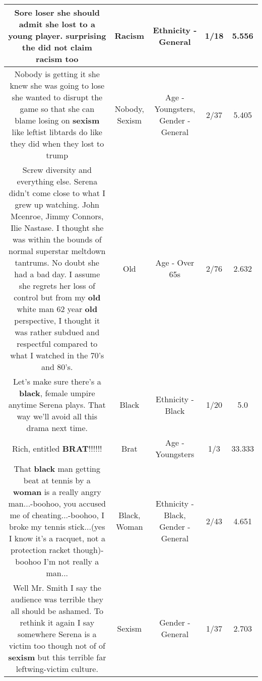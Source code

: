 \documentclass[11pt]{article}
\newlength\mylength
\begin{document}
\begin{center}
\begin{longtable}{|C{.65\mylength}|C{.30\mylength}|C{.12\mylength}|C{.12\mylength}|C{.12\mylength}|}
  \small Sore loser she should admit she lost to a young player. surprising the did not claim \textbf{racism} too\normalsize   & Racism & Ethnicity - General & 1/18 & 5.556 \\  \hline
  \small Nobody is getting it she knew she was going to lose she wanted to disrupt the game so that she can blame losing on \textbf{sexism} like leftist libtards do like they did when they lost to trump\normalsize   & Nobody, Sexism & Age - Youngsters, Gender - General & 2/37 & 5.405 \\  \hline
  \small Screw diversity and everything else.  Serena didn't come close to what I grew up watching.  John Mcenroe, Jimmy Connors, Ilie Nastase.  I thought she was within the bounds of normal  superstar meltdown tantrums.  No doubt she had a bad day.  I assume she regrets her loss of control but from my \textbf{old} white man 62 year \textbf{old} perspective, I thought it was rather subdued and respectful compared to what I watched in the 70's and 80's.\normalsize   & Old & Age - Over 65s & 2/76 & 2.632 \\  \hline
  \small Let's make sure there's a \textbf{black}, female umpire anytime Serena plays. That way we'll avoid all this drama next time.\normalsize   & Black & Ethnicity - Black & 1/20 & 5.0 \\  \hline
  \small Rich, entitled \textbf{BRAT}!!!!!!\normalsize   & Brat & Age - Youngsters & 1/3 & 33.333 \\  \hline
  \small That \textbf{black} man getting beat at tennis by a \textbf{woman} is a really angry man...-boohoo, you accused me of cheating...-boohoo, I broke my tennis stick...(yes I know it's a racquet, not a protection racket though)-boohoo I'm not really a man...\normalsize   & Black, Woman & Ethnicity - Black, Gender - General & 2/43 & 4.651 \\  \hline
  \small Well Mr. Smith I say the audience was terrible they all should be ashamed. To rethink it again I say somewhere Serena is a victim too though not of of \textbf{sexism} but this terrible far leftwing-victim culture.\normalsize   & Sexism & Gender - General & 1/37 & 2.703 \\  \hline

\end{longtable}
\end{center}
\end{document}
